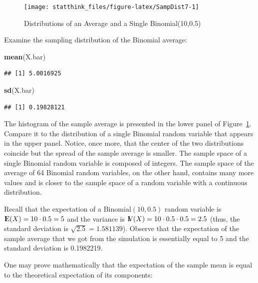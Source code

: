 \documentclass[]{krantz}
\makeatletter
\newenvironment{Shaded}{\begin{snugshade}}{\end{snugshade}}
\newcommand{\KeywordTok}[1]{\textcolor[rgb]{0.13,0.29,0.53}{\textbf{#1}}}
\newcommand{\NormalTok}[1]{#1}
\newcommand{\Expec}{{\rm I\kern-.3em E}}
\newcommand{\Var}{{\rm I\kern-.3em V}}
\newenvironment{kframe}{%
\medskip{}
\setlength{\fboxsep}{.8em}
 \def\at@end@of@kframe{}%
 \ifinner\ifhmode%
  \def\at@end@of@kframe{\end{minipage}}%
  \begin{minipage}{\columnwidth}%
 \fi\fi%
 \def\FrameCommand##1{\hskip\@totalleftmargin \hskip-\fboxsep
 \colorbox{shadecolor}{##1}\hskip-\fboxsep
     \hskip-\linewidth \hskip-\@totalleftmargin \hskip\columnwidth}%
 \MakeFramed {\advance\hsize-\width
   \@totalleftmargin\z@ \linewidth\hsize
   \@setminipage}}%
 {\par\unskip\endMakeFramed%
 \at@end@of@kframe}
\renewenvironment{Shaded}{\begin{kframe}}{\end{kframe}}
\theoremstyle{definition}
\theoremstyle{definition}
\theoremstyle{definition}
\theoremstyle{remark}
\makeatother
\begin{document}
\begin{figure}

{\centering \texttt{[image: statthink\_files/figure-latex/SampDist7-1]} 

}

\caption{Distributions of an Average and a Single Binomial(10,0.5)}\label{fig:SampDist7}
\end{figure}

Examine the sampling distribution of the Binomial average:

\begin{Shaded}
\begin{Highlighting}[]
\KeywordTok{mean}\NormalTok{(X.bar)}
\end{Highlighting}
\end{Shaded}

\begin{verbatim}
## [1] 5.0016925
\end{verbatim}

\begin{Shaded}
\begin{Highlighting}[]
\KeywordTok{sd}\NormalTok{(X.bar)}
\end{Highlighting}
\end{Shaded}

\begin{verbatim}
## [1] 0.19828121
\end{verbatim}

The histogram of the sample average is presented in the lower panel of
Figure~\ref{fig:SampDist7}. Compare it to the distribution of a single
Binomial random variable that appears in the upper panel. Notice, once
more, that the center of the two distributions coincide but the spread
of the sample average is smaller. The sample space of a single Binomial
random variable is composed of integers. The sample space of the average
of 64 Binomial random variables, on the other hand, contains many more
values and is closer to the sample space of a random variable with a
continuous distribution.

Recall that the expectation of a \(\mathrm{Binomial}(10,0.5)\) random
variable is \(\Expec(X) = 10 \cdot 0.5 = 5\) and the variance is
\(\Var(X) = 10 \cdot 0.5 \cdot 0.5 = 2.5\) (thus, the standard deviation
is \(\sqrt{2.5} = 1.581139\)). Observe that the expectation of the sample
average that we got from the simulation is essentially equal to 5 and
the standard deviation is 0.1982219.

One may prove mathematically that the expectation of the sample mean is
equal to the theoretical expectation of its components:
\end{document}
